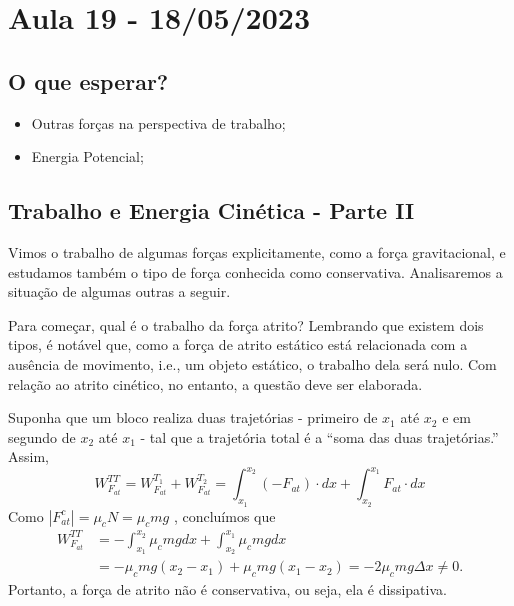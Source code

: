 \documentclass{article}
\begin{document}
\section{Aula 19 - 18/05/2023}
\subsection{O que esperar?}
\begin{itemize}
  \item Outras for\c cas na perspectiva de trabalho;
  \item Energia Potencial;
\end{itemize}
\subsection{Trabalho e Energia Cinética - Parte II}
  Vimos o trabalho de algumas for\c cas explicitamente, como a for\c ca gravitacional,
  e estudamos também o tipo de for\c ca conhecida como conservativa. Analisaremos
  a situa\c cão de algumas outras a seguir.

  Para come\c car, qual é o trabalho da for\c ca atrito? Lembrando que existem dois tipos,
é notável que, como a for\c ca de atrito estático está relacionada com a ausência de movimento,
i.e., um objeto estático, o trabalho dela será nulo. Com rela\c cão ao
atrito cinético, no entanto, a questão deve ser elaborada.

  Suponha que um bloco realiza duas trajetórias - primeiro de \(x_1\) até \(x_2\)
e em segundo de \(x_2\) até \(x_1\) - tal que a trajetória total é a ``soma das duas trajetórias.''
Assim, 
  \[
    W_{F_{at}}^{TT} = W_{F_{at}}^{T_1} + W_{F_{at}}^{T_2} = \int_{x_{1}}^{x_{2}}(-F_{at})\cdot dx + \int_{x_{2}}^{x_{1}}F_{at}\cdot dx
  \]
Como \(|F_{at}^{c}| = \mu_{c}N = \mu_{c}mg\) , concluímos que 
\begin{align*}
    W_{F_{at}}^{TT} &= -\int_{x_{1}}^{x_{2}}\mu_{c}mgdx + \int_{x_{2}}^{x_{1}}\mu_{c}mgdx\\
                    &= -\mu_{c}mg(x_{2}-x_{1}) + \mu_{c}mg(x_{1}-x_{2}) = -2\mu_{c}mg\Delta x\neq 0.
\end{align*}
Portanto, a for\c ca de atrito não é conservativa, ou seja, ela é dissipativa.
\end{document}
